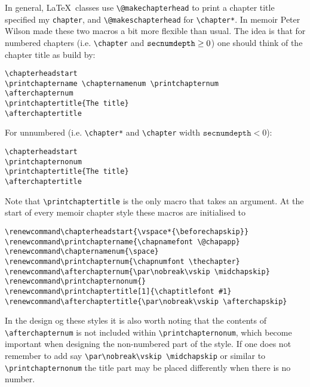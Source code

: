 In general, \LaTeX\ classes use \verb+\@makechapterhead+ to print a
chapter title specified my \verb|chapter|, and
\verb+\@makeschapterhead+ for \verb+\chapter*+. In memoir Peter Wilson
made these two macros a bit more flexible than usual. The idea is
that for numbered chapters (i.e. \verb+\chapter+ and
$\texttt{secnumdepth}\geq\nobreak 0$) one should think of the chapter title as
build by:
\begin{Verbatim}
\chapterheadstart
\printchaptername \chapternamenum \printchapternum
\afterchapternum
\printchaptertitle{The title}  
\afterchaptertitle
\end{Verbatim}
For unnumbered (i.e. \verb+\chapter*+ and \verb+\chapter+ width
$\texttt{secnumdepth}<0$): 
\begin{Verbatim}
\chapterheadstart
\printchapternonum
\printchaptertitle{The title}
\afterchaptertitle  
\end{Verbatim}
Note that \verb+\printchaptertitle+ is the only macro that takes an
argument. At the start of every memoir chapter style these macros are
initialised to
\begin{Verbatim}
\renewcommand\chapterheadstart{\vspace*{\beforechapskip}}
\renewcommand\printchaptername{\chapnamefont \@chapapp}
\renewcommand\chapternamenum{\space}
\renewcommand\printchapternum{\chapnumfont \thechapter}
\renewcommand\afterchapternum{\par\nobreak\vskip \midchapskip}
\renewcommand\printchapternonum{}
\renewcommand\printchaptertitle[1]{\chaptitlefont #1}
\renewcommand\afterchaptertitle{\par\nobreak\vskip \afterchapskip}
\end{Verbatim}
In the design og these styles it is also worth noting that the
contents of \verb|\afterchapternum| is not included within
\verb|\printchapternonum|, which become important when designing the
non-numbered part of the style. If one does not remember to add say 
\verb|\par\nobreak\vskip \midchapskip| or similar to
\verb|\printchapternonum| the title part may be placed differently
when there is no number.

